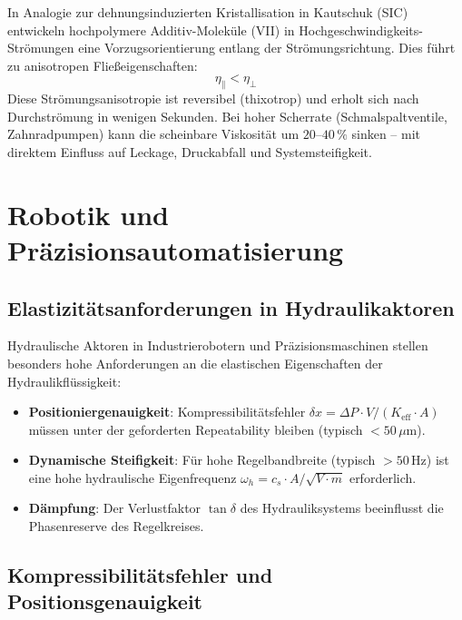 ﻿\documentclass[a4paper,12pt]{scrreprt}
\theoremstyle{definition}
\begin{document}
In Analogie zur dehnungsinduzierten Kristallisation in Kautschuk (SIC)
entwickeln hochpolymere Additiv-Moleküle (VII) in Hochgeschwindigkeits-Strömungen
eine Vorzugsorientierung entlang der Strömungsrichtung. Dies führt zu
anisotropen Fließeigenschaften:
\begin{equation}
  \eta_{\parallel} < \eta_{\perp}
  \label{eq:anisotropie_vii}
\end{equation}
Diese Strömungsanisotropie ist reversibel (thixotrop) und erholt sich
nach Durchströmung in wenigen Sekunden. Bei hoher Scherrate (Schmalspaltventile,
Zahnradpumpen) kann die scheinbare Viskosität um $20$--$40\,\%$ sinken --
mit direktem Einfluss auf Leckage, Druckabfall und Systemsteifigkeit.

\section{Robotik und Präzisionsautomatisierung}

\subsection{Elastizitätsanforderungen in Hydraulikaktoren}

Hydraulische Aktoren in Industrierobotern und Präzisionsmaschinen stellen
besonders hohe Anforderungen an die elastischen Eigenschaften der Hydraulik\-flüssigkeit:

\begin{itemize}
  \item \textbf{Positioniergenauigkeit}: Kompressibilitätsfehler
    $\delta x = \Delta P \cdot V / (K_{\mathrm{eff}} \cdot A)$ müssen
    unter der geforderten Repeatability bleiben (typisch $< 50\,\mu\mathrm{m}$).
  \item \textbf{Dynamische Steifigkeit}: Für hohe Regelbandbreite (typisch
    $> 50\,\mathrm{Hz}$) ist eine hohe hydraulische Eigenfrequenz
    $\omega_h = c_s \cdot A / \sqrt{V \cdot m}$ erforderlich.
  \item \textbf{Dämpfung}: Der Verlustfaktor $\tan\delta$ des Hydrauliksystems
    beeinflusst die Phasenreserve des Regelkreises.
\end{itemize}

\subsection{Kompressibilitätsfehler und Positionsgenauigkeit}
\end{document}
